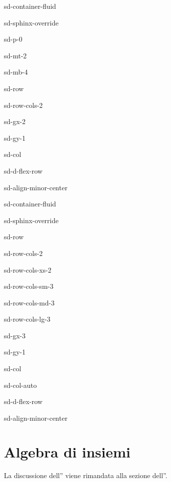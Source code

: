 \documentclass[letterpaper,10pt,italian]{jupyterBook}
\begin{document}
\begin{sphinxuseclass}{sd-container-fluid}
\begin{sphinxuseclass}{sd-sphinx-override}
\begin{sphinxuseclass}{sd-p-0}
\begin{sphinxuseclass}{sd-mt-2}
\begin{sphinxuseclass}{sd-mb-4}
\begin{sphinxuseclass}{sd-row}
\begin{sphinxuseclass}{sd-row-cols-2}
\begin{sphinxuseclass}{sd-gx-2}
\begin{sphinxuseclass}{sd-gy-1}
\begin{sphinxuseclass}{sd-col}
\begin{sphinxuseclass}{sd-d-flex-row}
\begin{sphinxuseclass}{sd-align-minor-center}
\begin{sphinxuseclass}{sd-container-fluid}
\begin{sphinxuseclass}{sd-sphinx-override}
\begin{sphinxuseclass}{sd-row}
\begin{sphinxuseclass}{sd-row-cols-2}
\begin{sphinxuseclass}{sd-row-cols-xs-2}
\begin{sphinxuseclass}{sd-row-cols-sm-3}
\begin{sphinxuseclass}{sd-row-cols-md-3}
\begin{sphinxuseclass}{sd-row-cols-lg-3}
\begin{sphinxuseclass}{sd-gx-3}
\begin{sphinxuseclass}{sd-gy-1}
\begin{sphinxuseclass}{sd-col}
\begin{sphinxuseclass}{sd-col-auto}
\begin{sphinxuseclass}{sd-d-flex-row}
\begin{sphinxuseclass}{sd-align-minor-center}
\end{sphinxuseclass}
\end{sphinxuseclass}
\end{sphinxuseclass}
\end{sphinxuseclass}
\end{sphinxuseclass}
\end{sphinxuseclass}
\end{sphinxuseclass}
\end{sphinxuseclass}
\end{sphinxuseclass}
\end{sphinxuseclass}
\end{sphinxuseclass}
\end{sphinxuseclass}
\end{sphinxuseclass}
\end{sphinxuseclass}
\end{sphinxuseclass}
\end{sphinxuseclass}
\end{sphinxuseclass}
\end{sphinxuseclass}
\end{sphinxuseclass}
\end{sphinxuseclass}
\end{sphinxuseclass}
\end{sphinxuseclass}
\end{sphinxuseclass}
\end{sphinxuseclass}
\end{sphinxuseclass}
\end{sphinxuseclass}

\chapter{Algebra di insiemi}
\label{\detokenize{ch/algebra/set-algebra-link:algebra-di-insiemi}}\label{\detokenize{ch/algebra/set-algebra-link:math-hs-algebra-set-link}}\label{\detokenize{ch/algebra/set-algebra-link::doc}}
\sphinxAtStartPar
La discussione dell”{\hyperref[\detokenize{ch/set:math-hs-set-algebra}]{}} viene rimandata alla sezione dell”{\hyperref[\detokenize{ch/set:math-hs-set}]{}}.

\sphinxstepscope
\end{document}
